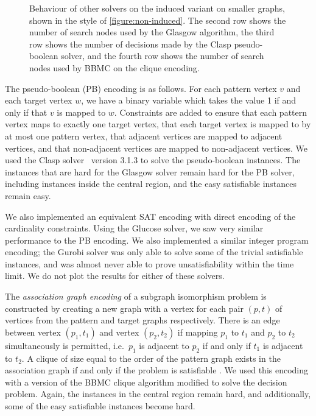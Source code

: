\documentclass[letterpaper]{article}
\begin{document}
\begin{figure*}[t]
    \setlength{\abovecaptionskip}{0pt}
    
    \caption{Behaviour of other solvers on the induced variant on smaller graphs, shown in the style of
        \cref{figure:non-induced}. The second row shows the number of search nodes used by the
    Glasgow algorithm, the third row shows the number of decisions made by the Clasp pseudo-boolean
solver, and the fourth row shows the number of search nodes used by BBMC on the clique
encoding.}\label{figure:alt}
\end{figure*}

The pseudo-boolean (PB) encoding is as follows. For each pattern vertex $v$ and each target
vertex $w$, we have a binary variable which takes the value 1 if and only if that $v$ is mapped to
$w$.  Constraints are added to ensure that each pattern vertex maps to exactly one target vertex,
that each target vertex is mapped to by at most one pattern vertex, that adjacent vertices are
mapped to adjacent vertices, and that non-adjacent vertices are mapped to non-adjacent vertices. We
used the Clasp solver~\citep{gekakaosscsc11a} version 3.1.3 to solve the pseudo-boolean instances.
The instances that are hard for the Glasgow solver remain hard for the PB solver, including
instances inside the central region, and the easy satisfiable instances remain easy.

We also implemented an equivalent SAT encoding with direct encoding of the cardinality constraints.
Using the Glucose solver, we saw very similar performance to the PB encoding. We also implemented a
similar integer program encoding; the Gurobi solver was only able to solve some of the trivial
satisfiable instances, and was almost never able to prove unsatisfiability within the time limit. We
do not plot the results for either of these solvers.

The \emph{association graph encoding} of a subgraph isomorphism problem is constructed by creating a
new graph with a vertex for each pair $(p, t)$ of vertices from the pattern and target graphs
respectively. There is an edge between vertex $(p_1, t_1)$ and vertex $(p_2, t_2)$ if mapping $p_1$
to $t_1$ and $p_2$ to $t_2$ simultaneously is permitted, i.e.\ $p_1$ is adjacent to $p_2$ if and
only if $t_1$ is adjacent to $t_2$. A clique of size equal to the order of the pattern graph exists
in the association graph if and only if the problem is satisfiable \citep{Levi:1973}.  We used this
encoding with a version of the BBMC clique algorithm \citep{SanSegundo:2011} modified to solve the
decision problem. Again, the instances in the central region remain hard, and additionally, some of
the easy satisfiable instances become hard.
\end{document}
